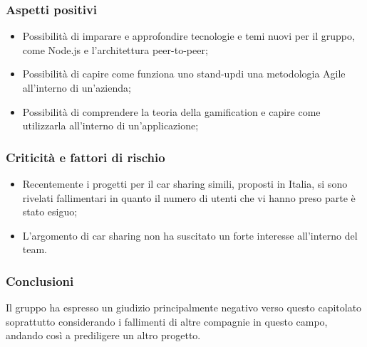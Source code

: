 \subsubsection{Aspetti positivi}
\begin{itemize}
	\item Possibilità di imparare e approfondire tecnologie e temi nuovi per il 
gruppo, come Node.js\glo{} e l'architettura peer-to-peer\glo{};
	\item Possibilità di capire come funziona uno stand-up\glosp di una metodologia Agile\glosp 
all'interno di un'azienda;
	\item Possibilità di comprendere la teoria della gamification\glo{} e capire come 
utilizzarla all'interno di un'applicazione;
\end{itemize}

\subsubsection{Criticità e fattori di rischio}
\begin{itemize}
	\item Recentemente i progetti per il car sharing simili, proposti in Italia, si 
sono rivelati fallimentari in quanto il numero di utenti che vi hanno preso 
parte è stato esiguo;

	\item L'argomento di car sharing non ha suscitato un forte interesse 
all'interno del team.
\end{itemize}
\subsubsection{Conclusioni}
Il gruppo ha espresso un giudizio principalmente negativo verso questo capitolato 
soprattutto considerando i fallimenti di altre compagnie in questo campo, 
andando così a prediligere un altro progetto.

